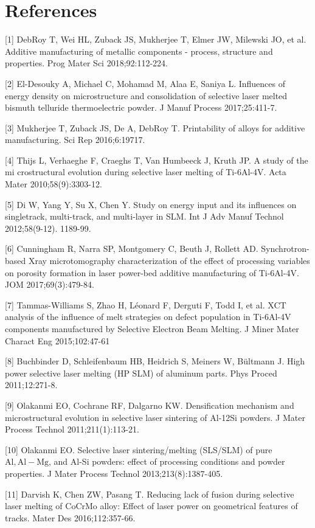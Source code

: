 \documentclass[10pt]{article}
\begin{document}
\section*{References}
[1] DebRoy T, Wei HL, Zuback JS, Mukherjee T, Elmer JW, Milewski JO, et al. Additive manufacturing of metallic components - process, structure and properties. Prog Mater Sci 2018;92:112-224.

[2] El-Desouky A, Michael C, Mohamad M, Alaa E, Saniya L. Influences of energy density on microstructure and consolidation of selective laser melted bismuth telluride thermoelectric powder. J Manuf Process 2017;25:411-7.

[3] Mukherjee T, Zuback JS, De A, DebRoy T. Printability of alloys for additive manufacturing. Sci Rep 2016;6:19717.

[4] Thijs L, Verhaeghe F, Craeghs T, Van Humbeeck J, Kruth JP. A study of the mi crostructural evolution during selective laser melting of Ti-6Al-4V. Acta Mater 2010;58(9):3303-12.

[5] Di W, Yang Y, Su X, Chen Y. Study on energy input and its influences on singletrack, multi-track, and multi-layer in SLM. Int J Adv Manuf Technol 2012;58(9-12). 1189-99.

[6] Cunningham R, Narra SP, Montgomery C, Beuth J, Rollett AD. Synchrotron-based Xray microtomography characterization of the effect of processing variables on porosity formation in laser power-bed additive manufacturing of Ti-6Al-4V. JOM 2017;69(3):479-84.

[7] Tammas-Williams S, Zhao H, Léonard F, Derguti F, Todd I, et al. XCT analysis of the influence of melt strategies on defect population in Ti-6Al-4V components manufactured by Selective Electron Beam Melting. J Miner Mater Charact Eng 2015;102:47-61

[8] Buchbinder D, Schleifenbaum HB, Heidrich S, Meiners W, Bültmann J. High power selective laser melting (HP SLM) of aluminum parts. Phys Proced 2011;12:271-8.

[9] Olakanmi EO, Cochrane RF, Dalgarno KW. Densification mechanism and microstructural evolution in selective laser sintering of Al-12Si powders. J Mater Process Technol 2011;211(1):113-21.

[10] Olakanmi EO. Selective laser sintering/melting (SLS/SLM) of pure $\mathrm{Al}, \mathrm{Al}-\mathrm{Mg}$, and Al-Si powders: effect of processing conditions and powder properties. J Mater Process Technol 2013;213(8):1387-405.

[11] Darvish K, Chen ZW, Pasang T. Reducing lack of fusion during selective laser melting of CoCrMo alloy: Effect of laser power on geometrical features of tracks. Mater Des 2016;112:357-66.
\end{document}
